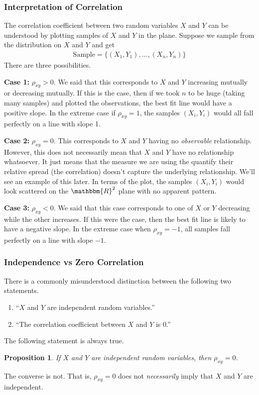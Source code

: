 \documentclass[11pt,letterpaper]{article}
\newcommand\real{\mathbbm{R}}
\numberwithin{theorem}{section}
\numberwithin{definition}{section}
\numberwithin{lemma}{section}
\numberwithin{corollary}{section}
\newtheorem{proposition}[theorem]{Proposition}
\numberwithin{proposition}{section}
\theoremstyle{definition}
\numberwithin{remark}{section}
\numberwithin{claim}{section}
\numberwithin{observation}{section}
\numberwithin{fact}{section}
\numberwithin{assumption}{section}
\numberwithin{example}{section}
\numberwithin{exercise}{section}
\begin{document}
\subsubsection{Interpretation of Correlation}
The correlation coefficient between two random variables $X$ and $Y$ can be understood by plotting samples of $X$ and $Y$ in the plane. Suppose we sample from the distribution on $X$ and $Y$ and get
\begin{align*}
\text{Sample} = \{(X_1,Y_1),\dots,(X_n,Y_n)\}
\end{align*}
There are three possibilities. 

\textbf{Case 1:} $\rho_{xy} > 0$. We said that this corresponds to $X$ and $Y$ increasing mutually or decreasing mutually. If this is the case, then if we took $n$ to be huge (taking many samples) and plotted the observations, the best fit line would have a positive slope. In the extreme case if $\rho_{xy} = 1$, the samples $(X_i,Y_i)$ would all fall perfectly on a line with slope 1.

\textbf{Case 2:} $\rho_{xy} = 0$. This corresponds to $X$ and $Y$ having no \textit{observable} relationship. However, this does not necessarily mean that $X$ and $Y$ have no relationship whatsoever. It just means that the measure we are using the quantify their relative spread (the correlation) doesn't capture the underlying relationship. We'll see an example of this later. In terms of the plot, the samples $(X_i,Y_i)$ would look scattered on the $\real^2$ plane with no apparent pattern.

\textbf{Case 3:} $\rho_{xy} < 0$. We said that this case corresponds to one of $X$ or $Y$ decreasing while the other increases. If this were the case, then the best fit line is likely to have a negative slope. In the extreme case when $\rho_{xy} = -1$, all samples fall perfectly on a line with slope $-1$.

\subsubsection{Independence vs Zero Correlation}
There is a commonly misunderstood distinction between the following two statements.
\begin{enumerate}
\item ``$X$ and $Y$ are independent random variables.''

\item ``The correlation coefficient between $X$ and $Y$ is 0.''
\end{enumerate}
The following statement is always true.
\begin{proposition}
If $X$ and $Y$ are independent random variables, then $\rho_{xy} = 0$.
\end{proposition}
The converse is not. That is, $\rho_{xy} = 0$ does not \textit{necessarily} imply that $X$ and $Y$ are independent.
\end{document}
